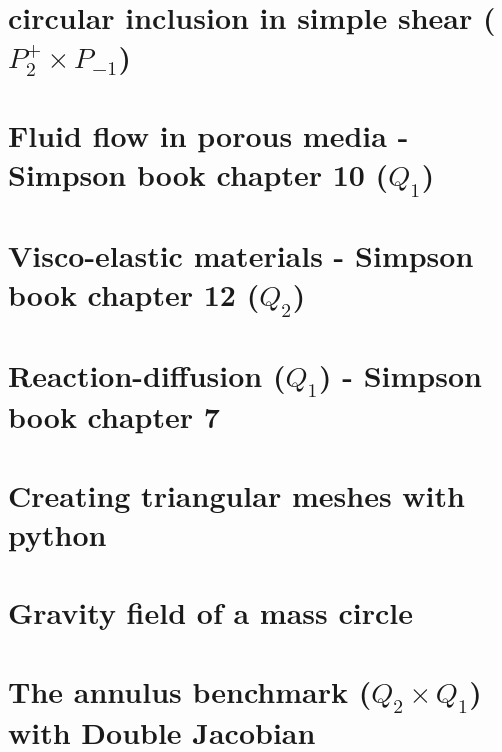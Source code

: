 \documentclass[a4paper,11pt]{report}
\begin{document}
\chapter{circular inclusion in simple shear ($P_2^+\times P_{-1}$)\label{f127}} %

\chapter{Fluid flow in porous media - Simpson book chapter 10 ($Q_1$)\label{f128}} %

\chapter{Visco-elastic materials - Simpson book chapter 12 ($Q_2$)\label{f129}} %

\chapter{Reaction-diffusion ($Q_1$) - Simpson book chapter 7\label{f130}} %

\chapter{Creating triangular meshes with python \label{f131}} %

\chapter{Gravity field of a mass circle\label{f132}} %

\chapter{The annulus benchmark ($Q_2\times Q_1$) with Double Jacobian \label{133}} %
\end{document}
